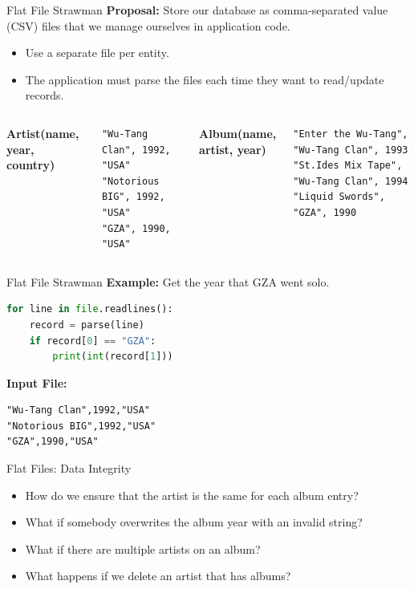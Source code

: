 \documentclass[aspectratio=169, 10pt]{beamer}
\begin{document}
\begin{frame}[fragile]{Flat File Strawman}
    \textbf{Proposal:} Store our database as comma-separated value (CSV) files that we manage ourselves in application code.
    \begin{itemize}
        \item Use a separate file per entity.
        \item The application must parse the files each time they want to read/update records.
    \end{itemize}
    \vspace{0.5em}
    \begin{columns}
        \textbf{Artist(name, year, country)}
        \begin{verbatim}
"Wu-Tang Clan", 1992, "USA"
"Notorious BIG", 1992, "USA"
"GZA", 1990, "USA"
        \end{verbatim}
        \textbf{Album(name, artist, year)}
        \begin{verbatim}
"Enter the Wu-Tang", "Wu-Tang Clan", 1993
"St.Ides Mix Tape", "Wu-Tang Clan", 1994
"Liquid Swords", "GZA", 1990
        \end{verbatim}
    \end{columns}
\end{frame}

\begin{frame}[fragile]{Flat File Strawman}
    \textbf{Example:} Get the year that GZA went solo.
    \vspace{1em}
    \begin{lstlisting}[language=Python]
for line in file.readlines():
    record = parse(line)
    if record[0] == "GZA":
        print(int(record[1]))
    \end{lstlisting}
    \vspace{1em}
    \textbf{Input File:}
    \begin{verbatim}
"Wu-Tang Clan",1992,"USA"
"Notorious BIG",1992,"USA"
"GZA",1990,"USA"
    \end{verbatim}
\end{frame}

\begin{frame}{Flat Files: Data Integrity}
    \begin{itemize}
        \item How do we ensure that the artist is the same for each album entry?
        \item What if somebody overwrites the album year with an invalid string?
        \item What if there are multiple artists on an album?
        \item What happens if we delete an artist that has albums?
    \end{itemize}
\end{frame}
\end{document}
